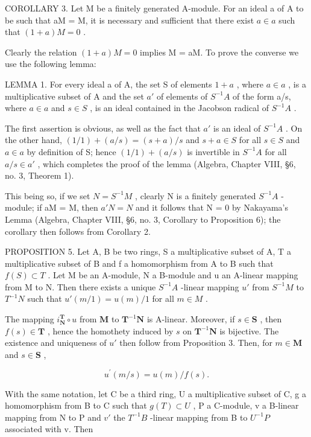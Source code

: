 COROLLARY 3. Let M be a finitely generated A-module. For an ideal a of A to be such that aM = M, it is necessary and sufficient that there exist \(a \in a\) such that \((1 + a)M = 0\) .

Clearly the relation \((1 + a)M = 0\) implies M = aM. To prove the converse we use the following lemma:

LEMMA 1. For every ideal a of A, the set S of elements \(1 + a\) , where \(a \in a\) , is a multiplicative subset of A and the set \(a'\) of elements of \(S^{-1}A\) of the form a/s, where \(a \in a\) and \(s \in S\) , is an ideal contained in the Jacobson radical of \(S^{-1}A\) .

The first assertion is obvious, as well as the fact that \(a'\) is an ideal of \(S^{-1}A\) . On the other hand, \((1/1) + (a/s) = (s + a)/s\) and \(s + a \in S\) for all \(s \in S\) and \(a \in a\) by definition of S; hence \((1/1) + (a/s)\) is invertible in \(S^{-1}A\) for all \(a/s \in a'\) , which completes the proof of the lemma (Algebra, Chapter VIII, §6, no. 3, Theorem 1).

This being so, if we set \(N = S^{-1}M\) , clearly N is a finitely generated \(S^{-1}A\) -module; if aM = M, then \(a'N = N\) and it follows that N = 0 by Nakayama's Lemma (Algebra, Chapter VIII, §6, no. 3, Corollary to Proposition 6); the corollary then follows from Corollary 2.

PROPOSITION 5. Let A, B be two rings, S a multiplicative subset of A, T a multiplicative subset of B and f a homomorphism from A to B such that \(f(S) \subset T\) . Let M be an A-module, N a B-module and u an A-linear mapping from M to N. Then there exists a unique \(S^{-1}A\) -linear mapping \(u'\) from \(S^{-1}M\) to \(T^{-1}N\) such that \(u'(m/1) = u(m)/1\) for all \(m \in M\) .

The mapping \(i_{\mathbf{N}}^{\mathbf{T}} \circ u\) from \(\mathbf{M}\) to \(\mathbf{T}^{-1}\mathbf{N}\) is A-linear. Moreover, if \(s \in \mathbf{S}\) , then \(f(s) \in \mathbf{T}\) , hence the homothety induced by \(s\) on \(\mathbf{T}^{-1}\mathbf{N}\) is bijective. The existence and uniqueness of \(u'\) then follow from Proposition 3. Then, for \(m \in \mathbf{M}\) and \(s \in \mathbf{S}\) ,

\[
u ^ {\prime} (m / s) = u (m) / f (s).\tag{6}
\]

With the same notation, let C be a third ring, U a multiplicative subset of C, g a homomorphism from B to C such that \(g(T) \subset U\) , P a C-module, v a B-linear mapping from N to P and \(v'\) the \(T^{-1}B\) -linear mapping from B to \(U^{-1}P\) associated with v. Then

